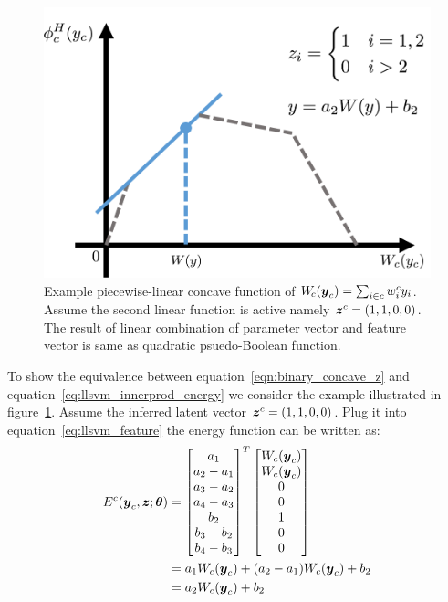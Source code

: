 \begin{figure}[t]
  \centering
  \includegraphics[width=0.8\columnwidth]{Methodology/figures/linEnvLatentFig.png}
  \caption{\label{fig:concave} Example piecewise-linear concave
    function of $W_{\!c}({\boldsymbol{y}}_c) = \sum_{i \in c} w^c_i y_i$.
    Assume the second linear function is active namely
    ${\boldsymbol{z}}^c=(1,1,0,0)$. The result of linear combination of
    parameter vector and feature vector is same as quadratic
    psuedo-Boolean function.}
\end{figure}

To show the equivalence between
equation~\eqref{eqn:binary_concave_z} and
equation~\eqref{eq:llsvm_innerprod_energy} we consider the
example illustrated in figure~\ref{fig:concave}. Assume the
inferred latent vector ${\boldsymbol{z}}^c=(1,1,0,0)$. Plug it into
equation~\eqref{eq:llsvm_feature} the energy function can be
written as:
\begin{align*}
  E^c({\boldsymbol{y}}_c,{\boldsymbol{z}}; \boldsymbol{\theta}) &=
  \begin{bmatrix}
    a_1\\
    a_2-a_1\\
    a_3-a_2\\
    a_4-a_3\\
    b_2\\
    b_3-b_2\\
    b_4-b_3
  \end{bmatrix}^T
  \begin{bmatrix}
    W_c({\boldsymbol{y}}_c) \\
    W_c({\boldsymbol{y}}_c) \\
    0\\
    0\\
    1\\
    0\\
    0
  \end{bmatrix}\\
  &=a_1W_c({\boldsymbol{y}}_c)+(a_2-a_1)W_c({\boldsymbol{y}}_c)+b_2\\
  &=a_2W_c({\boldsymbol{y}}_c)+b_2
\end{align*}

